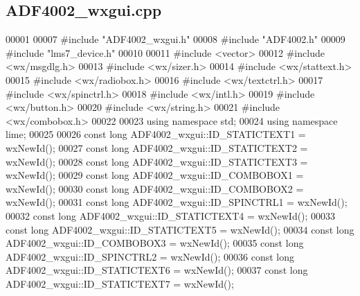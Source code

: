 \subsection{A\+D\+F4002\+\_\+wxgui.\+cpp}
\label{ADF4002__wxgui_8cpp_source}

\begin{DoxyCode}
00001 
00007 \textcolor{preprocessor}{#include "ADF4002_wxgui.h"}
00008 \textcolor{preprocessor}{#include "ADF4002.h"}
00009 \textcolor{preprocessor}{#include "lms7_device.h"}
00010 
00011 \textcolor{preprocessor}{#include <vector>}
00012 \textcolor{preprocessor}{#include <wx/msgdlg.h>}
00013 \textcolor{preprocessor}{#include <wx/sizer.h>}
00014 \textcolor{preprocessor}{#include <wx/stattext.h>}
00015 \textcolor{preprocessor}{#include <wx/radiobox.h>}
00016 \textcolor{preprocessor}{#include <wx/textctrl.h>}
00017 \textcolor{preprocessor}{#include <wx/spinctrl.h>}
00018 \textcolor{preprocessor}{#include <wx/intl.h>}
00019 \textcolor{preprocessor}{#include <wx/button.h>}
00020 \textcolor{preprocessor}{#include <wx/string.h>}
00021 \textcolor{preprocessor}{#include <wx/combobox.h>}
00022 
00023 \textcolor{keyword}{using namespace }std;
00024 \textcolor{keyword}{using namespace }lime;
00025 
00026 \textcolor{keyword}{const} \textcolor{keywordtype}{long} ADF4002_wxgui::ID_STATICTEXT1 = wxNewId();
00027 \textcolor{keyword}{const} \textcolor{keywordtype}{long} ADF4002_wxgui::ID_STATICTEXT2 = wxNewId();
00028 \textcolor{keyword}{const} \textcolor{keywordtype}{long} ADF4002_wxgui::ID_STATICTEXT3 = wxNewId();
00029 \textcolor{keyword}{const} \textcolor{keywordtype}{long} ADF4002_wxgui::ID_COMBOBOX1 = wxNewId();
00030 \textcolor{keyword}{const} \textcolor{keywordtype}{long} ADF4002_wxgui::ID_COMBOBOX2 = wxNewId();
00031 \textcolor{keyword}{const} \textcolor{keywordtype}{long} ADF4002_wxgui::ID_SPINCTRL1 = wxNewId();
00032 \textcolor{keyword}{const} \textcolor{keywordtype}{long} ADF4002_wxgui::ID_STATICTEXT4 = wxNewId();
00033 \textcolor{keyword}{const} \textcolor{keywordtype}{long} ADF4002_wxgui::ID_STATICTEXT5 = wxNewId();
00034 \textcolor{keyword}{const} \textcolor{keywordtype}{long} ADF4002_wxgui::ID_COMBOBOX3 = wxNewId();
00035 \textcolor{keyword}{const} \textcolor{keywordtype}{long} ADF4002_wxgui::ID_SPINCTRL2 = wxNewId();
00036 \textcolor{keyword}{const} \textcolor{keywordtype}{long} ADF4002_wxgui::ID_STATICTEXT6 = wxNewId();
00037 \textcolor{keyword}{const} \textcolor{keywordtype}{long} ADF4002_wxgui::ID_STATICTEXT7 = wxNewId();

\end{DoxyCode}
